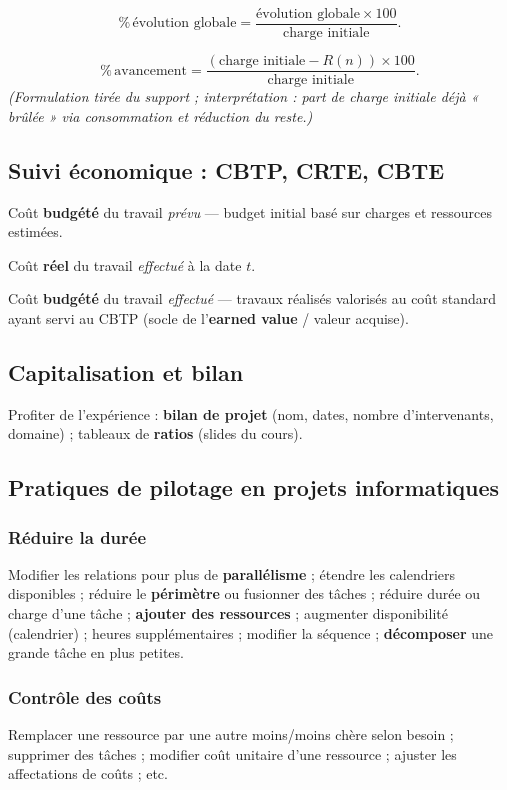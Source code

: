 \documentclass[11pt,a4paper]{article}
\begin{document}
\[\%\,\text{évolution globale} = \frac{\text{évolution globale} \times 100}{\text{charge initiale}}.\]

\[\%\,\text{avancement} = \frac{(\text{charge initiale} - R(n)) \times 100}{\text{charge initiale}}.\]
\textit{(Formulation tirée du support ; interprétation : part de charge initiale déjà « brûlée » via consommation et réduction du reste.)}

\subsection{Suivi économique : CBTP, CRTE, CBTE}
\begin{description}[style=nextline]
  \item[CBTP] Coût \textbf{budgété} du travail \emph{prévu} — budget initial basé sur charges et ressources estimées.
  \item[CRTE] Coût \textbf{réel} du travail \emph{effectué} à la date $t$.
  \item[CBTE] Coût \textbf{budgété} du travail \emph{effectué} — travaux réalisés valorisés au coût standard ayant servi au CBTP (socle de l'\textbf{earned value} / valeur acquise).
\end{description}

\subsection{Capitalisation et bilan}
Profiter de l'expérience : \textbf{bilan de projet} (nom, dates, nombre d'intervenants, domaine) ; tableaux de \textbf{ratios} (slides du cours).

\subsection{Pratiques de pilotage en projets informatiques}

\subsubsection{Réduire la durée}
Modifier les relations pour plus de \textbf{parallélisme} ; étendre les calendriers disponibles ; réduire le \textbf{périmètre} ou fusionner des tâches ; réduire durée ou charge d'une tâche ; \textbf{ajouter des ressources} ; augmenter disponibilité (calendrier) ; heures supplémentaires ; modifier la séquence ; \textbf{décomposer} une grande tâche en plus petites.

\subsubsection{Contrôle des coûts}
Remplacer une ressource par une autre moins/moins chère selon besoin ; supprimer des tâches ; modifier coût unitaire d'une ressource ; ajuster les affectations de coûts ; etc.
\end{document}
